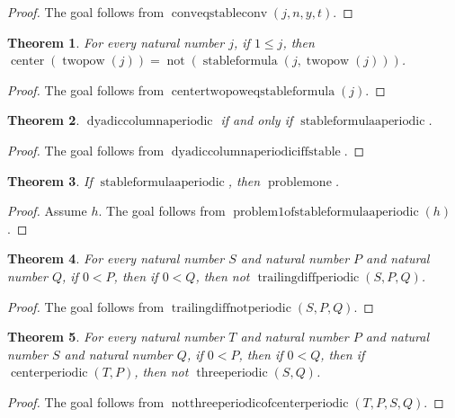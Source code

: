 \documentclass[11pt]{article}
\newtheorem{theorem}{Theorem}[section]
\theoremstyle{definition}
\begin{document}
\begin{proof}
The goal follows from \(\operatorname{conveqstableconv}(j, n, y, t)\).
\end{proof}
\begin{theorem}
\label{ll:observations:center-twopow-eq-stable-formula}
For every natural number \(j\), if \(1 \le j\), then \(\operatorname{center}(\operatorname{twopow}(j)) = \operatorname{not}(\operatorname{stableformula}(j, \operatorname{twopow}(j)))\).
\end{theorem}
\begin{proof}
The goal follows from \(\operatorname{centertwopoweqstableformula}(j)\).
\end{proof}
\begin{theorem}
\label{ll:observations:dyadic-column-aperiodic-iff-stable}
\(\operatorname{dyadiccolumnaperiodic}\) if and only if \(\operatorname{stableformulaaperiodic}\).
\end{theorem}
\begin{proof}
The goal follows from \(\operatorname{dyadiccolumnaperiodiciffstable}\).
\end{proof}
\begin{theorem}
\label{ll:observations:problem1-of-stable-formula-aperiodic}
If \(\operatorname{stableformulaaperiodic}\), then \(\operatorname{problemone}\).
\end{theorem}
\begin{proof}
Assume \(h\).
The goal follows from \(\operatorname{problem1ofstableformulaaperiodic}(h)\).
\end{proof}
\begin{theorem}
\label{ll:observations:trailing-diff-not-periodic}
For every natural number \(S\) and natural number \(P\) and natural number \(Q\), if \(0 < P\), then if \(0 < Q\), then not \(\operatorname{trailingdiffperiodic}(S, P, Q)\).
\end{theorem}
\begin{proof}
The goal follows from \(\operatorname{trailingdiffnotperiodic}(S, P, Q)\).
\end{proof}
\begin{theorem}
\label{ll:observations:not-three-periodic-of-center-periodic}
For every natural number \(T\) and natural number \(P\) and natural number \(S\) and natural number \(Q\), if \(0 < P\), then if \(0 < Q\), then if \(\operatorname{centerperiodic}(T, P)\), then not \(\operatorname{threeperiodic}(S, Q)\).
\end{theorem}
\begin{proof}
The goal follows from \(\operatorname{notthreeperiodicofcenterperiodic}(T, P, S, Q)\).
\end{proof}
\end{document}
